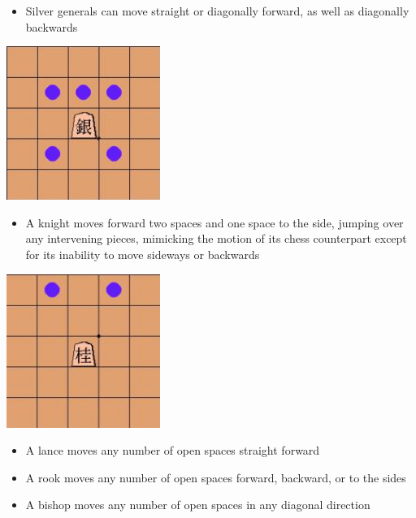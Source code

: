 \documentclass[letterpaper,12pt]{article}
\begin{document}
 \begin{itemize}
  \item Silver generals can move straight or diagonally forward, as well as diagonally backwards
 \end{itemize}
 
 \begin{center}
  \includegraphics[width=5cm]{img/silverMove.jpg}
 \end{center}
  
 \begin{itemize}
  \item A knight moves forward two spaces and one space to the side, jumping over any intervening pieces, mimicking the motion of its chess counterpart except for its inability to move sideways or backwards
 \end{itemize}
 
 \begin{center}
  \includegraphics[width=5cm]{img/knightMove.jpg}
 \end{center}
 
 \begin{itemize}
  \item A lance moves any number of open spaces straight forward
  \item A rook moves any number of open spaces forward, backward, or to the sides
  \item A bishop moves any number of open spaces in any diagonal direction
 \end{itemize}
 
\end{document}
